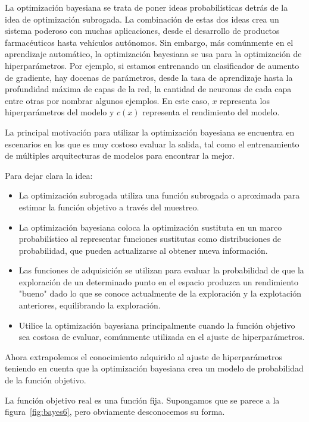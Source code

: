 \documentclass[a4paper,12pt]{article}
\begin{document}
La optimización bayesiana se trata de poner ideas probabilísticas detrás de la idea de optimización subrogada. La combinación de estas dos ideas crea un sistema poderoso con muchas aplicaciones, desde el desarrollo de productos farmacéuticos hasta vehículos autónomos. Sin embargo, más comúnmente en el aprendizaje automático, la optimización bayesiana se usa para la optimización de hiperparámetros. Por ejemplo, si estamos entrenando un clasificador de aumento de gradiente, hay docenas de parámetros, desde la tasa de aprendizaje hasta la profundidad máxima de capas de la red, la cantidad de neuronas de cada capa entre otras por nombrar algunos ejemplos. En este caso, $x$ representa los hiperparámetros del modelo y $c(x)$ representa el rendimiento del modelo.

\clearpage

La principal motivación para utilizar la optimización bayesiana se encuentra en escenarios en los que es muy costoso evaluar la salida, tal como el entrenamiento de múltiples arquitecturas de modelos para encontrar la mejor.

Para dejar clara la idea:

\begin{itemize}[noitemsep, topsep=2pt]
	\item La optimización subrogada utiliza una función subrogada o aproximada para estimar la función objetivo a través del muestreo.
	\item La optimización bayesiana coloca la optimización sustituta en un marco probabilístico al representar funciones sustitutas como distribuciones de probabilidad, que pueden actualizarse al obtener nueva información.
	\item Las funciones de adquisición se utilizan para evaluar la probabilidad de que la exploración de un determinado punto en el espacio produzca un rendimiento "bueno" dado lo que se conoce actualmente de la exploración y la explotación anteriores, equilibrando la exploración.
	\item Utilice la optimización bayesiana principalmente cuando la función objetivo sea costosa de evaluar, comúnmente utilizada en el ajuste de hiperparámetros.
\end{itemize}

Ahora extrapolemos el conocimiento adquirido al ajuste de hiperparámetros teniendo en cuenta que la optimización bayesiana crea un modelo de probabilidad de la función objetivo. \citep{Wang2020Apr}

La función objetivo real es una función fija. Supongamos que se parece a la figura~\ref{fig:bayes6}, pero obviamente desconocemos su forma.
\end{document}
